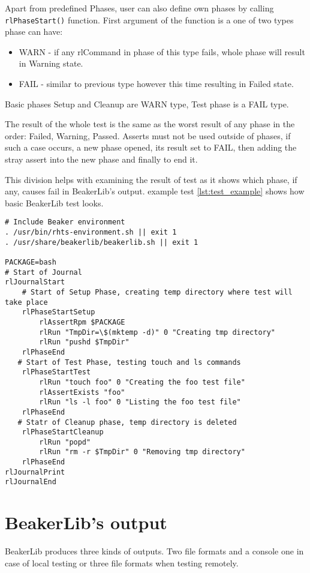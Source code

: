 Apart from predefined Phases, user can also define own phases by calling \texttt{rlPhaseStart()} function. First argument of the function is a one of two types phase can have:

\begin{itemize}
\item WARN - if any rlCommand in phase of this type fails, whole phase will result in Warning state.
\item FAIL - similar to previous type however this time resulting in Failed state.
\end{itemize}

Basic phases Setup and Cleanup are WARN type, Test phase is a FAIL type.

The result of the whole test is the same as the worst result of any phase in the order: Failed, Warning, Passed.
Asserts must not be used outside of phases, if such a case occurs, a new phase opened, its result set to FAIL, then adding the stray assert into the new phase and finally to end it. 

This division helps with examining the result of test as it shows which phase, if any, causes fail in BeakerLib's output. 
example test \ref{lst:test_example} shows how basic BeakerLib test looks.

\begin{minipage}{\linewidth}
\begin{lstlisting}[style=beakerlib_bash,caption={BeakerLib basic test example},label={lst:test_example}]
# Include Beaker environment
. /usr/bin/rhts-environment.sh || exit 1
. /usr/share/beakerlib/beakerlib.sh || exit 1

PACKAGE=bash
# Start of Journal
rlJournalStart
    # Start of Setup Phase, creating temp directory where test will take place 
    rlPhaseStartSetup
        rlAssertRpm $PACKAGE
        rlRun "TmpDir=\$(mktemp -d)" 0 "Creating tmp directory"
        rlRun "pushd $TmpDir"
    rlPhaseEnd
   # Start of Test Phase, testing touch and ls commands
    rlPhaseStartTest
        rlRun "touch foo" 0 "Creating the foo test file"
        rlAssertExists "foo"
        rlRun "ls -l foo" 0 "Listing the foo test file"
    rlPhaseEnd
   # Statr of Cleanup phase, temp directory is deleted
    rlPhaseStartCleanup
        rlRun "popd"
        rlRun "rm -r $TmpDir" 0 "Removing tmp directory"
    rlPhaseEnd
rlJournalPrint
rlJournalEnd
\end{lstlisting}
\end{minipage}

\section{BeakerLib's output}
BeakerLib produces three kinds of outputs. Two file formats and a console one in case of local testing or three file formats when testing remotely.

